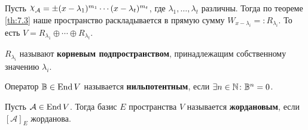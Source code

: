 \documentclass[../main.tex]{subfiles}
\begin{document}
Пусть $\rchi_{\mathcal{A}} = \pm (x - \lambda_1)^{m_1} \dotsm (x - \lambda_t)^{m_t}$, где $\lambda_1, \dotsc, \lambda_t$ различны. Тогда по теореме \ref{th:7.3} наше пространство раскладывается в прямую сумму $W_{x - \lambda_i} =: R_{\lambda_i}$. То есть $V = R_{\lambda_1} \oplus \dotsb \oplus R_{\lambda_t}$.

\begin{definition}
  $R_{\lambda_i}$ называют \textbf{корневым подпространством}, принадлежащим собственному значению $\lambda_i$.
\end{definition}

\begin{definition}
  Оператор $\mathbb{B} \in \operatorname{End} V$ называется \textbf{нильпотентным}, если $\exists n \in \mathbb{N}\colon \mathbb{B}^n = 0$.
\end{definition}

\begin{definition}
  Пусть $\mathcal{A} \in \operatorname{End} V$. Тогда базис $E$ пространства $V$ называется \textbf{жордановым}, если $[\mathcal{A}]_E$ жорданова.
\end{definition}
\end{document}
